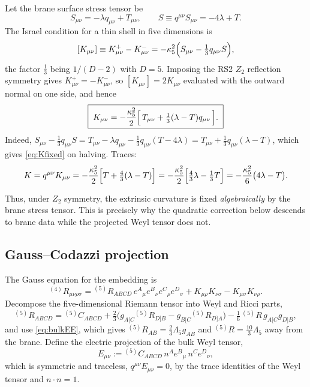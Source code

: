 \documentclass[11pt,a4paper]{article}
\theoremstyle{plain}
\theoremstyle{definition}
\newcommand{\kfive}{\kappa_5}
\newcommand{\Lfive}{\Lambda_5}
\begin{document}
Let the brane surface stress tensor be
\begin{equation}
\label{eq:Smunu}
S_{\mu\nu}=-\lambda q_{\mu\nu}+T_{\mu\nu},
\qquad
S\equiv q^{\mu\nu}S_{\mu\nu}=-4\lambda+T .
\end{equation}
The Israel condition \cite{Israel} for a thin shell in five dimensions is
\begin{equation}
\label{eq:israel}
[K_{\mu\nu}]\equiv K^+_{\mu\nu}-K^-_{\mu\nu}
=-\kfive^2\Bigl(S_{\mu\nu}-\tfrac13q_{\mu\nu}S\Bigr),
\end{equation}
the factor $\tfrac13$ being $1/(D-2)$ with $D=5$. Imposing the RS2 $Z_2$
reflection symmetry gives $K^+_{\mu\nu}=-K^-_{\mu\nu}$, so
$[K_{\mu\nu}]=2K_{\mu\nu}$ evaluated with the outward normal on one side,
and hence
\begin{equation}
\label{eq:Kfixed}
\boxed{\;
K_{\mu\nu}
=-\frac{\kfive^2}{2}
\Bigl[\,T_{\mu\nu}+\tfrac13(\lambda-T)q_{\mu\nu}\,\Bigr].
\;}
\end{equation}
Indeed, $S_{\mu\nu}-\tfrac13q_{\mu\nu}S
=T_{\mu\nu}-\lambda q_{\mu\nu}
-\tfrac13q_{\mu\nu}(T-4\lambda)
=T_{\mu\nu}+\tfrac13q_{\mu\nu}(\lambda-T)$,
which gives \eqref{eq:Kfixed} on halving. Traces:
\begin{equation}
\label{eq:Ktrace}
K=q^{\mu\nu}K_{\mu\nu}
=-\frac{\kfive^2}{2}\Bigl[T+\tfrac43(\lambda-T)\Bigr]
=-\frac{\kfive^2}{2}\Bigl[\tfrac43\lambda-\tfrac13T\Bigr]
=-\frac{\kfive^2}{6}\bigl(4\lambda-T\bigr).
\end{equation}

Thus, under $Z_2$ symmetry, the extrinsic curvature is fixed
\emph{algebraically} by the brane stress tensor. This is precisely why
the quadratic correction below descends to brane data while the projected
Weyl tensor does not.

\subsection{Gauss--Codazzi projection}
\label{sec:gauss}

The Gauss equation for the embedding is
\begin{equation}
\label{eq:gauss}
{}^{(4)}R_{\mu\nu\rho\sigma}
={}^{(5)}R_{ABCD}\,
e^A{}_\mu e^B{}_\nu e^C{}_\rho e^D{}_\sigma
+K_{\mu\rho}K_{\nu\sigma}-K_{\mu\sigma}K_{\nu\rho}.
\end{equation}
Decompose the five-dimensional Riemann tensor into Weyl and Ricci parts,
\begin{equation}
\label{eq:weyldecomp}
{}^{(5)}R_{ABCD}
={}^{(5)}C_{ABCD}
+\tfrac23\bigl(g_{A[C}{}^{(5)}R_{D]B}
-g_{B[C}{}^{(5)}R_{D]A}\bigr)
-\tfrac16\,{}^{(5)}R\,g_{A[C}g_{D]B},
\end{equation}
and use \eqref{eq:bulkEE}, which gives
${}^{(5)}R_{AB}=\tfrac23\Lfive g_{AB}$ and
${}^{(5)}R=\tfrac{10}{3}\Lfive$ away from the brane. Define the electric
projection of the bulk Weyl tensor,
\begin{equation}
\label{eq:Edef}
E_{\mu\nu}:={}^{(5)}C_{ABCD}\,
n^Ae^B{}_\mu\,n^Ce^D{}_\nu ,
\end{equation}
which is symmetric and traceless, $q^{\mu\nu}E_{\mu\nu}=0$, by the trace
identities of the Weyl tensor and $n\cdot n=1$.
\end{document}

